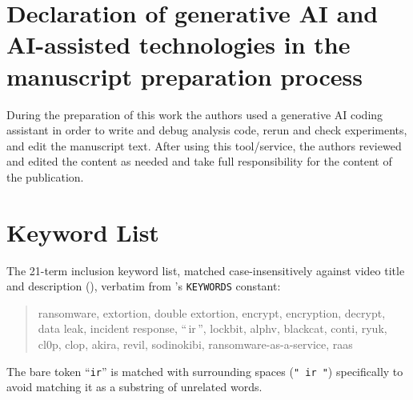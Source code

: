 \documentclass[preprint,12pt]{elsarticle}
\begin{document}
\section*{Declaration of generative AI and AI-assisted technologies in the manuscript preparation process}
During the preparation of this work the authors used a generative AI
coding assistant in order to write and debug analysis code, rerun and check
experiments, and edit the manuscript text. After using this tool/service,
the authors reviewed and edited the content as needed and take full
responsibility for the content of the publication.




\appendix
\section{Keyword List}
\label{app:keywords}
The 21-term inclusion keyword list, matched case-insensitively against
video title and description (), verbatim from
's \texttt{KEYWORDS} constant:

\begin{quote}
\raggedright\small\ttfamily
ransomware, extortion, double extortion, encrypt, encryption, decrypt,
data leak, incident response, ``\,ir\,'', lockbit, alphv, blackcat,
conti, ryuk, cl0p, clop, akira, revil, sodinokibi,
ransomware-as-a-service, raas
\end{quote}

The bare token ``\texttt{ir}'' is matched with surrounding spaces
(\texttt{"\ ir\ "}) specifically to avoid matching it as a substring of
unrelated words.
\end{document}
